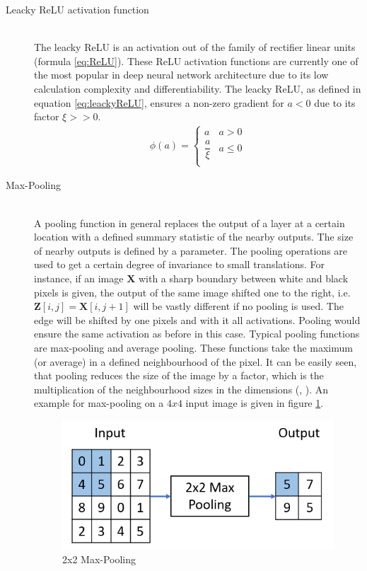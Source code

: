 \documentclass[12pt,DIV14,BCOR12mm,a4paper,footexclude,headinclude,halfparskip-,twoside,openright,cleardoubleempty,idxtotoc,bibtotoc,listtotoc,abstracton]{scrreprt} %
\numberwithin{equation}{chapter}
\begin{document}
\begin{description}
	\item[Leacky ReLU activation function]\hfill \\
	The leacky ReLU \cite{Xu15LReLU} is an activation out of the family of rectifier linear units (formula \ref{eq:ReLU}). These ReLU activation functions are currently one of the most popular in deep neural network architecture due to its low calculation complexity and differentiability. The leacky ReLU, as defined in equation \ref{eq:leackyReLU}, ensures a non-zero gradient for $ a < 0$ due to its factor $\xi >> 0$.
	\begin{align}
		\phi(a) = \begin{cases} a & a > 0\\ \dfrac{a}{\xi} & a \leq 0\\ \end{cases} \label{eq:leackyReLU}
	\end{align}	
	\item[Max-Pooling]\hfill \\
	A pooling function in general replaces the output of a layer at a certain location with a defined summary statistic of the nearby outputs. The size of nearby outputs is defined by a parameter. The pooling operations are used to get a certain degree of invariance to small translations. For instance, if an image $\mathbf{X}$ with a sharp boundary between white and black pixels is given, the output of the same image shifted one to the right, i.e. $\mathbf{Z}[i, j] = \mathbf{X}[i, j+1]$ will be vastly different if no pooling is used. The edge will be shifted by one pixels and with it all activations. Pooling would ensure the same activation as before in this case. Typical pooling functions are max-pooling and average pooling. These functions take the maximum (or average) in a defined neighbourhood of the pixel. It can be easily seen, that pooling reduces the size of the image by a factor, which is the multiplication of the neighbourhood sizes in the dimensions (\cite{Goodfellow-et-al-2016}, \cite{DeepLearningDive}). An example for max-pooling on a $4x4$ input image is given in figure \ref{fig:Max-Pooling}.
\begin{figure}[htb!]
	\centering
	\includegraphics[width=0.5\linewidth]{Graphiken/2x2_MaxPooling}
	\caption{2x2 Max-Pooling}
	\label{fig:Max-Pooling}
\end{figure}	
\end{description}
\end{document}
